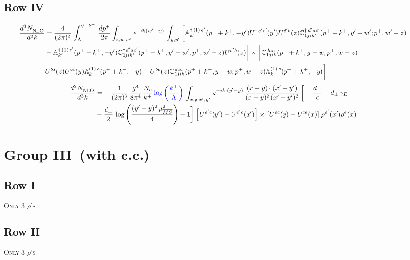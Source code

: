 \documentclass[9pt]{article}
\def\mf#1{\mathbb{#1}}
\numberwithin{equation}{section}
\begin{document}
\subsection{Row IV}
\begin{align}
    \frac{d^{3}N_{\rm NLO}^{\rm}}{d^{3}k}  & = \frac{4}{(2\pi)^{3}}\,\int_{\Lambda}^{\vee-k^{+}}\, \frac{dp^{+}}{2\pi}\int_{z,w,w^{\prime}} e^{-ik(w^{\prime}-w)}\,  \int_{y,y^{\prime}}\bigg[\mf{A}^{\dagger\, (1)\,e^{\prime}}_{k^{\prime}}(p^{+}+k^{+},-y^{\prime})U^{\dagger\, e^{\prime}c^{\prime}}(y^{\prime})U^{d^{\prime}b}(z) \Bar{\mf{C}}^{\dagger\, d^{\prime}ac^{\prime}}_{1jik^{\prime}}(p^{+}+k^{+},y^{\prime}-w^{\prime}; p^{+},w^{\prime}-z) \notag \\ &  -\Bar{\mf{A}}^{\dagger\, (1)\,c^{\prime}}_{k^{\prime}}(p^{+}+k^{+},-y^{\prime}) \Bar{\mf{C}}^{\dagger\, d^{\prime}ac^{\prime}}_{1jik^{\prime}}(p^{+}+k^{+},y^{\prime}-w^{\prime}; p^{+},w^{\prime}-z)U^{d^{\prime}b}(z)\bigg]\times\bigg[\Bar{\mf{C}}^{dac}_{1jik}(p^{+}+k^{+},y-w; p^{+},w-z)\notag \\ & U^{bd}(z)U^{ce}(y) \mf{A}^{(1)\,e}_{k}(p^{+}+k^{+},-y) -U^{bd}(z) \Bar{\mf{C}}^{dac}_{1jik}(p^{+}+k^{+},y-w; p^{+},w-z)\Bar{\mf{A}}^{(1)\,c}_{k}(p^{+}+k^{+},-y)\bigg]\nonumber
\end{align}
\begin{align}
    \frac{d^{3}N_{\rm NLO}^{\rm}}{d^{3}k}  & =  +\,\frac{1}{(2\pi)^{3}}\,\frac{g^{4}}{8\pi^{4}}\, \frac{N_{c}}{k^{+}}\,{\color{blue}\log{\left(\frac{k^{+}}{\Lambda}\right)}}\,\int_{x,y,x',y'}\,e^{-ik\cdot (y'-y)}\,\frac{(x-y)\cdot (x'-y')}{(x-y)^{2}\,(x'-y')^{2}}\,\bigg[-\frac{d_{\perp}}{\epsilon}-d_{\perp}\,\gamma_{E}\notag \\ & -\frac{d_{\perp}}{2}\,\log{\left(\frac{(y'-y)^{2}\,\mu^{2}_{\overline{MS}}}{4}\right)}-1\bigg]\,\left[U^{e'c}(y') - U^{e'c}(x')\right] \times\, \left[U^{ec}(y) - U^{ce}(x)\right]\, \rho^{e'}(x') \rho^{e}(x)
\end{align}
\section{Group III\, (with c.c.)}
\subsection{Row I}
\textsc{Only 3 $\rho$'s}
\subsection{Row II}
\textsc{Only 3 $\rho$'s}
\end{document}
